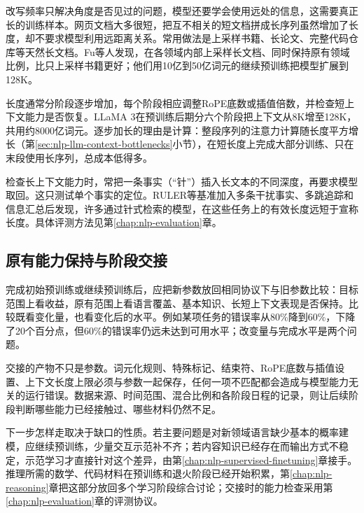 改写频率只解决角度是否见过的问题，模型还要学会使用远处的信息，这需要真正长的训练样本。网页文档大多很短，把互不相关的短文档拼成长序列虽然增加了长度，却不要求模型利用远距离关系。常用做法是上采样书籍、长论文、完整代码仓库等天然长文档。Fu等人发现，在各领域内部上采样长文档、同时保持原有领域比例，比只上采样书籍更好；他们用10亿到50亿词元的继续预训练把模型扩展到128K。

长度通常分阶段逐步增加，每个阶段相应调整RoPE底数或插值倍数，并检查短上下文能力是否恢复。LLaMA 3在预训练后期分六个阶段把上下文从8K增至128K，共用约8000亿词元。逐步加长的理由是计算：整段序列的注意力计算随长度平方增长（第\ref{sec:nlp-llm-context-bottlenecks}小节），在短长度上完成大部分训练、只在末段使用长序列，总成本低得多。

检查长上下文能力时，常把一条事实（“针”）插入长文本的不同深度，再要求模型取回。这只测试单个事实的定位。RULER等基准加入多条干扰事实、多跳追踪和信息汇总后发现，许多通过针式检索的模型，在这些任务上的有效长度远短于宣称长度。具体评测方法见第\ref{chap:nlp-evaluation}章。

\subsection{原有能力保持与阶段交接}
\label{sec:nlp-llm-pretraining-handoff}

完成初始预训练或继续预训练后，应把新参数放回相同协议下与旧参数比较：目标范围上看收益，原有范围上看语言覆盖、基本知识、长短上下文表现是否保持。比较既看变化量，也看变化后的水平。例如某项任务的错误率从80\%降到60\%，下降了20个百分点，但60\%的错误率仍远未达到可用水平；改变量与完成水平是两个问题。

交接的产物不只是参数。词元化规则、特殊标记、结束符、RoPE底数与插值设置、上下文长度上限必须与参数一起保存，任何一项不匹配都会造成与模型能力无关的运行错误。数据来源、时间范围、混合比例和各阶段日程的记录，则让后续阶段判断哪些能力已经接触过、哪些材料仍然不足。

下一步怎样走取决于缺口的性质。若主要问题是对新领域语言缺少基本的概率建模，应继续预训练，少量交互示范补不齐；若内容知识已经存在而输出方式不稳定，示范学习才直接针对这个差异，由第\ref{chap:nlp-supervised-finetuning}章接手。推理所需的数学、代码材料在预训练和退火阶段已经开始积累，第\ref{chap:nlp-reasoning}章把这部分放回多个学习阶段综合讨论；交接时的能力检查采用第\ref{chap:nlp-evaluation}章的评测协议。
